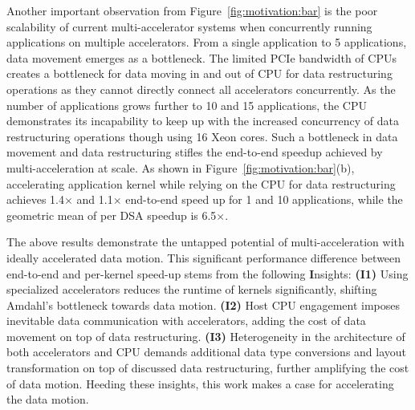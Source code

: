 Another important observation from Figure~\ref{fig:motivation:bar} is the poor scalability of current multi-accelerator systems when concurrently running applications on multiple accelerators. 
From a single application to 5 applications, data movement emerges as a bottleneck. The limited PCIe bandwidth of CPUs creates a bottleneck for data moving in and out of CPU for data restructuring operations as they cannot directly connect all accelerators concurrently. %
As the number of applications grows further to 10 and 15 applications, the CPU demonstrates its incapability to keep up with the increased concurrency of data restructuring operations though using 16 Xeon cores. %
%
Such a bottleneck in data movement and data restructuring stifles the end-to-end speedup achieved by multi-acceleration at scale. As shown in Figure~\ref{fig:motivation:bar}(b), accelerating application kernel while relying on the CPU for data restructuring achieves 1.4$\times$ and 1.1$\times$ end-to-end speed up for 1 and 10 applications, while the geometric mean of per DSA speedup is 6.5$\times$. %
%
%

The above results demonstrate the untapped potential of multi-acceleration with ideally accelerated data motion.
%
This significant performance difference between end-to-end and per-kernel speed-up stems from the following \textbf{I}nsights:
%
\textbf{(I1)} Using specialized accelerators reduces the runtime of kernels significantly, shifting Amdahl's bottleneck towards data motion.
%
\textbf{(I2)} Host CPU engagement imposes inevitable data communication with accelerators, adding the cost of data movement on top of data restructuring.
%
\textbf{(I3)} Heterogeneity in the architecture of both accelerators and CPU demands additional data type conversions and layout transformation on top of discussed data restructuring, further amplifying the cost of data motion.
%
Heeding these insights, this work makes a case for accelerating the data motion.
%
%

